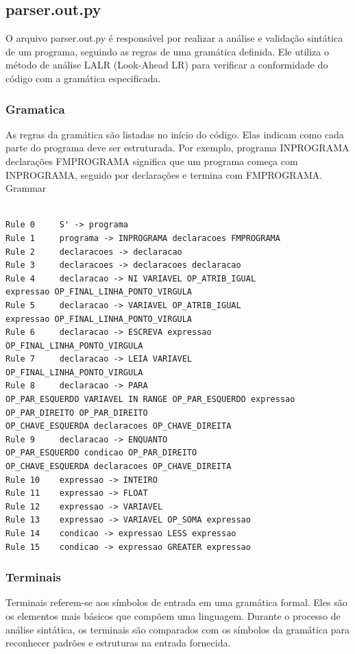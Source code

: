 \documentclass[a4paper,12pt]{article}
\begin{document}
\subsection{parser.out.py}
O arquivo parser.out.py é responsável por realizar a análise e validação 
sintática de um programa, seguindo as regras de uma gramática definida. 
Ele utiliza o método de análise LALR (Look-Ahead LR) para verificar a 
conformidade do código com a gramática especificada.

\subsubsection{Gramatica}
As regras da gramática são listadas no início do código. Elas indicam 
como cada parte do programa deve ser estruturada. Por exemplo, programa 
INPROGRAMA declarações FMPROGRAMA significa que um programa começa com 
INPROGRAMA, seguido por declarações e termina com FMPROGRAMA.
Grammar

\begin{verbatim}

Rule 0     S' -> programa
Rule 1     programa -> INPROGRAMA declaracoes FMPROGRAMA
Rule 2     declaracoes -> declaracao
Rule 3     declaracoes -> declaracoes declaracao
Rule 4     declaracao -> NI VARIAVEL OP_ATRIB_IGUAL 
expressao OP_FINAL_LINHA_PONTO_VIRGULA
Rule 5     declaracao -> VARIAVEL OP_ATRIB_IGUAL 
expressao OP_FINAL_LINHA_PONTO_VIRGULA
Rule 6     declaracao -> ESCREVA expressao 
OP_FINAL_LINHA_PONTO_VIRGULA
Rule 7     declaracao -> LEIA VARIAVEL 
OP_FINAL_LINHA_PONTO_VIRGULA
Rule 8     declaracao -> PARA 
OP_PAR_ESQUERDO VARIAVEL IN RANGE OP_PAR_ESQUERDO expressao 
OP_PAR_DIREITO OP_PAR_DIREITO 
OP_CHAVE_ESQUERDA declaracoes OP_CHAVE_DIREITA
Rule 9     declaracao -> ENQUANTO 
OP_PAR_ESQUERDO condicao OP_PAR_DIREITO 
OP_CHAVE_ESQUERDA declaracoes OP_CHAVE_DIREITA
Rule 10    expressao -> INTEIRO
Rule 11    expressao -> FLOAT
Rule 12    expressao -> VARIAVEL
Rule 13    expressao -> VARIAVEL OP_SOMA expressao
Rule 14    condicao -> expressao LESS expressao
Rule 15    condicao -> expressao GREATER expressao

\end{verbatim}



\subsubsection{Terminais}
Terminais referem-se aos símbolos de entrada em uma gramática formal. 
Eles são os elementos mais básicos que compõem uma linguagem. Durante o 
processo de análise sintática, os terminais são comparados com os 
símbolos da gramática para reconhecer padrões e estruturas na entrada 
fornecida.
\end{document}
